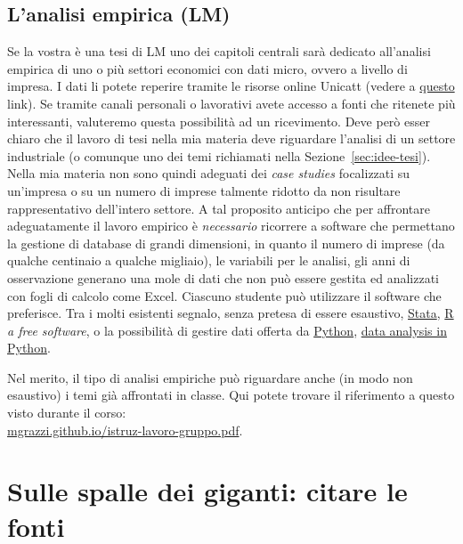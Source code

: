 \documentclass[12pt]{article}
\begin{document}
\subsection*{L'analisi empirica (LM)}
Se la vostra \`e una tesi di LM uno dei capitoli centrali sar\`a
dedicato all'analisi empirica di uno o pi\`u settori economici con
dati micro, ovvero a livello di impresa. I dati li potete reperire
tramite le risorse online Unicatt (vedere a
\href{https://biblioteche.unicatt.it/brescia-servizi-per-utenti-interni-ricerche-bibliografiche-e-banche-dati}{questo}
link). Se tramite canali personali o lavorativi avete accesso a fonti
che ritenete pi\`u interessanti, valuteremo questa possibilit\`a ad un
ricevimento. Deve per\`o esser chiaro che il lavoro di tesi nella mia
materia deve riguardare l'analisi di un settore industriale (o
comunque uno dei temi richiamati nella
Sezione~\ref{sec:idee-tesi}). Nella mia materia non sono quindi
adeguati dei \textit{case studies} focalizzati su un'impresa o su un
numero di imprese talmente ridotto da non risultare rappresentativo
dell'intero settore. A tal proposito anticipo che per affrontare
adeguatamente il lavoro empirico \`e \textit{necessario} ricorrere a
software che permettano la gestione di database di grandi dimensioni,
in quanto il numero di imprese (da qualche centinaio a qualche
migliaio), le variabili per le analisi, gli anni di osservazione
generano una mole di dati che non pu\`o essere gestita ed analizzati
con fogli di calcolo come Excel. Ciascuno studente pu\`o utilizzare il
software che preferisce. Tra i molti esistenti segnalo, senza pretesa
di essere esaustivo, \href{https://www.stata.com/}{Stata},
\href{https://www.r-project.org/}{R} \textit{a free software}, o la
possibilit\`a di gestire dati offerta da
\href{https://www.python.org/}{Python},
\href{http://www.data-analysis-in-python.org/}{data analysis in
  Python}.

Nel merito, il tipo di analisi empiriche pu\`o riguardare anche (in modo non
esaustivo) i temi gi\`a affrontati in classe. Qui potete trovare il
riferimento a questo
visto durante il corso:\\
\href{http://mgrazzi.github.io/istruz-lavoro-gruppo.pdf}{mgrazzi.github.io/istruz-lavoro-gruppo.pdf}.




\section{Sulle spalle dei giganti: citare le fonti}%
\end{document}
